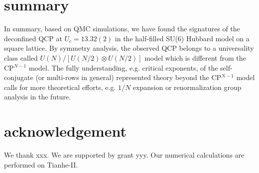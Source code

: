 \documentclass[twocolumn,superscriptaddress]{revtex4-1}
\begin{document}
\section{summary}

In summary, based on QMC simulations, we have found the signatures of the deconfined QCP at $U_c=13.32(2)$ in the half-filled SU(6) Hubbard model on a square lattice. By symmetry analysis, the observed QCP belongs to a universality class called $U(N)/[U(N/2)\otimes U(N/2)]$ model which is different from the CP$^{N-1}$ model. The fully understanding, e.g. critical exponents, of the self-conjugate (or multi-rows in general) represented theory beyond the CP$^{N-1}$ model calls for more theoretical efforts, e.g. $1/N$ expansion or renormalization group analysis in the future.

\section{acknowledgement}
We thank xxx.
We are supported by grant yyy.
Our numerical calculations are performed on Tianhe-II. 


\end{document}

